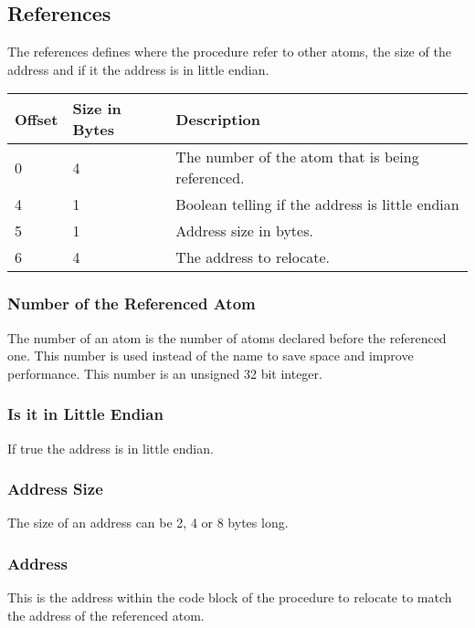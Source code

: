 \subsection{References}
The references defines where the procedure refer to other atoms, the size of the 
address and if it the address is in little endian.

\begin{table}[h]
    \centering
    \label{tbl:reference}
    \begin{tabular}{|l|l|l|}
        \hline
        \textbf{Offset} & \textbf{Size in Bytes} & \textbf{Description}                             \\ \hline
        0               & 4                      & The number of the atom that is being referenced. \\ \hline
        4               & 1                      & Boolean telling if the address is little endian  \\ \hline
        5               & 1                      & Address size in bytes.                           \\ \hline
        6               & 4                      & The address to relocate.                         \\ \hline
    \end{tabular}
\end{table}

\subsubsection{Number of the Referenced Atom}
The number of an atom is the number of atoms declared before the referenced one.
This number is used instead of the name to save space and improve performance. 
This number is an unsigned 32 bit integer.

\subsubsection{Is it in Little Endian}
If true the address is in little endian.

\subsubsection{Address Size}
The size of an address can be 2, 4 or 8 bytes long.

\subsubsection{Address}
This is the address within the code block of the procedure to relocate to match
the address of the referenced atom.